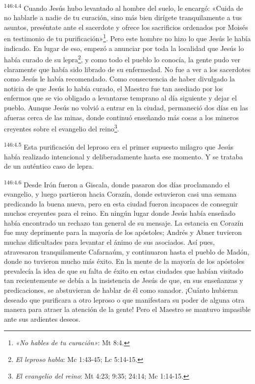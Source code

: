 \par
\textsuperscript{146:4.4} Cuando Jesús hubo levantado al hombre del suelo, le encargó: «Cuida de no hablarle a nadie de tu curación, sino más bien dirígete tranquilamente a tus asuntos, preséntate ante el sacerdote y ofrece los sacrificios ordenados por Moisés en testimonio de tu purificación»\footnote{\textit{«No hables de tu curación»}: Mt 8:4.}. Pero este hombre no hizo lo que Jesús le había indicado. En lugar de eso, empezó a anunciar por toda la localidad que Jesús lo había curado de su lepra\footnote{\textit{El leproso habla}: Mc 1:43-45; Lc 5:14-15.}, y como todo el pueblo lo conocía, la gente pudo ver claramente que había sido librado de su enfermedad. No fue a ver a los sacerdotes como Jesús le había recomendado. Como consecuencia de haber divulgado la noticia de que Jesús lo había curado, el Maestro fue tan asediado por los enfermos que se vio obligado a levantarse temprano al día siguiente y dejar el pueblo. Aunque Jesús no volvió a entrar en la ciudad, permaneció dos días en las afueras cerca de las minas, donde continuó enseñando más cosas a los mineros creyentes sobre el evangelio del reino\footnote{\textit{El evangelio del reino}: Mt 4:23; 9:35; 24:14; Mc 1:14-15.}.

\par
\textsuperscript{146:4.5} Esta purificación del leproso era el primer supuesto milagro que Jesús había realizado intencional y deliberadamente hasta ese momento. Y se trataba de un auténtico caso de lepra.

\par
\textsuperscript{146:4.6} Desde Irón fueron a Giscala, donde pasaron dos días proclamando el evangelio, y luego partieron hacia Corazín, donde estuvieron casi una semana predicando la buena nueva, pero en esta ciudad fueron incapaces de conseguir muchos creyentes para el reino. En ningún lugar donde Jesús había enseñado había encontrado un rechazo tan general de su mensaje. La estancia en Corazín fue muy deprimente para la mayoría de los apóstoles; Andrés y Abner tuvieron muchas dificultades para levantar el ánimo de sus asociados. Así pues, atravesaron tranquilamente Cafarnaúm, y continuaron hasta el pueblo de Madón, donde no tuvieron mucho más éxito. En la mente de la mayoría de los apóstoles prevalecía la idea de que su falta de éxito en estas ciudades que habían visitado tan recientemente se debía a la insistencia de Jesús de que, en sus enseñanzas y predicaciones, se abstuvieran de hablar de él como sanador. ¡Cuánto hubieran deseado que purificara a otro leproso o que manifestara su poder de alguna otra manera para atraer la atención de la gente! Pero el Maestro se mantuvo impasible ante sus ardientes deseos.


